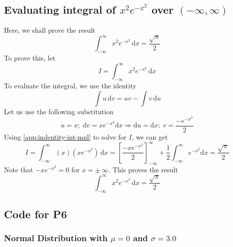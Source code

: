 \documentclass[main.tex]{article}
\begin{document}
    \subsection[Evaluating \texorpdfstring{$\int_{-\infty}^{\infty} x^{2}e^{-x^2} \mathrm{d}x$}{Integral((x**2)*exp(-x**2))}]{Evaluating integral of $x^{2}e^{-x^2}$ over $\left (-\infty, \infty \right )$}
    \label{app:proof-int-xsq-exp-mxsq}
    Here, we shall prove the result
    \begin{equation}
        \int_{-\infty}^{\infty} x^2 e^{-x^2} \, \mathrm{d}x = \frac{\sqrt{\pi}}{2}
    \end{equation}
    To prove this, let
    \begin{equation}
        I = \int_{-\infty}^{\infty} x^2 e^{-x^2} \, \mathrm{d}x
    \end{equation}
    To evaluate the integral, we use the identity
    \begin{equation}
        \int u \, \mathrm{d}v = uv - \int v \, \mathrm{d}u
        \label{app:indentity-int-mul}
    \end{equation}
    Let us use the following substitution
    \begin{equation}
        u = x ;\; \mathrm{d}v = xe^{-x^2} \mathrm{d}x \Rightarrow \mathrm{d}u = \mathrm{d}x ;\; v = \frac{-e^{-x^2}}{2}
    \end{equation}
    Using \ref{app:indentity-int-mul} to solve for $I$, we can get
    \begin{equation}
        I = \int_{-\infty}^{\infty} \left (x \right ) \left ( x e^{-x^2} \right ) \, \mathrm{d}x
        = \left [ \frac{-xe^{-x^2}}{2} \right ]_{-\infty}^{\infty} + \frac{1}{2} \int_{-\infty}^{\infty} e^{-x^2} \mathrm{d}x = \frac{\sqrt{\pi}}{2}
    \end{equation}
    Note that $-xe^{-x^2} = 0$ for $x = \pm \, \infty$. This proves the result
    \begin{equation}
        \int_{-\infty}^{\infty} x^2 e^{-x^2} \, \mathrm{d}x = \frac{\sqrt{\pi}}{2}
        \label{app:res-xsq-exp-mxsq}
    \end{equation}

    \pagebreak
    \subsection{Code for P6}
    \label{app:code-p6}
    \subsubsection[Normal Distribution]{Normal Distribution with $\mu = 0$ and $\sigma = 3.0$}
    \label{app:code-p6-normal}
    
\end{document}
